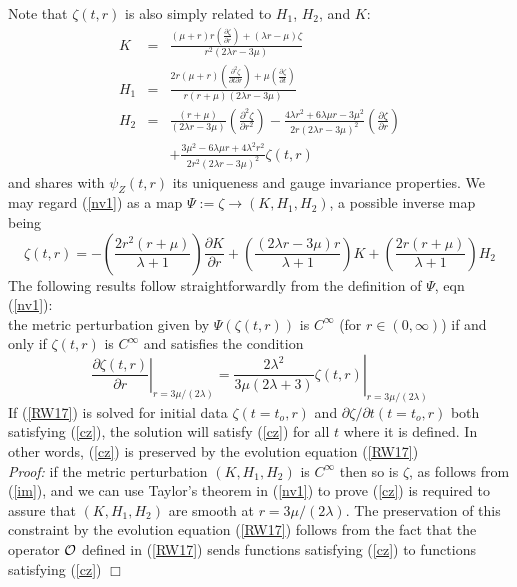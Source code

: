 \documentclass[12pt,aps,floats,showpacs,amssymb,tightenlines]{revtex4}
\newcommand{\p}{\partial}
\begin{document}
Note that $\zeta(t,r)$ is also simply related to $H_1$, $H_2$, and
$K$:
\begin{eqnarray} \nonumber
 K &=& \frac{(\mu+r) r \left( \frac{\p \zeta}{\p r}\right) + (\lambda r - \mu) \zeta}{r^2 (2\lambda r - 3
 \mu)}\\ \label{nv1}
H_1 & = & \frac{2 r (\mu+r) \left( \frac{\p^2 \zeta}{\p t \p r}
\right) + \mu \left( \frac{\p \zeta}{\p t} \right)}{r (r+\mu) (2
\lambda r - 3 \mu)} \\ \nonumber H_2 & = & \frac{(r+\mu)}{(2 \lambda
r - 3 \mu)} \left( \frac{\p^2\zeta}{\p r^2} \right) -  \frac{4
\lambda r^2 + 6 \lambda \mu r - 3 \mu^2}{2 r (2 \lambda r - 3
\mu)^2} \left( \frac{\p \zeta}{\p r} \right) \\ && + \frac{3 \mu^2 -
6\lambda \mu r + 4 \lambda^2r^2}{2 r^2(2 \lambda r - 3 \mu)^2}
\zeta(t,r) \nonumber
\end{eqnarray}
and shares with $\psi_Z(t,r)$ its uniqueness and gauge
 invariance properties.
We may regard (\ref{nv1}) as a map $\Psi:= \zeta \to (K,H_1,H_2)$, a
possible inverse map being
\begin{equation} \label{im}
\zeta(t,r) = -\left(\frac{2 r^2 (r + \mu)}{\lambda+1} \right)
\frac{\p K}{\p r} + \left( \frac{(2 \lambda r-3 \mu) r}{\lambda+1}
\right) K + \left(\frac{2 r (r + \mu)}{\lambda +1} \right) H_2
\end{equation}
The following results follow straightforwardly from the definition
of $\Psi$, eqn (\ref{nv1}):\\

  the metric perturbation given by
$\Psi(\zeta(t,r))$ is $C^{\infty}$ (for $r \in (0,\infty)$) if and
only if $\zeta(t,r)$ is $C^{\infty}$ and satisfies the condition
\begin{equation} \label{cz}
\left. \frac{\p \zeta(t,r)}{\p r}  \right|_{r=3\mu/(2 \lambda)} =
\left. \frac{2 \lambda^2}{3 \mu (2 \lambda+3)} \zeta(t,r)
\right|_{r=3\mu/(2 \lambda)}
\end{equation}
If (\ref{RW17}) is solved for initial data $\zeta(t=t_o,r)$ and $\p
\zeta /\p t (t=t_o,r)$ both satisfying (\ref{cz}), the solution will
satisfy  (\ref{cz}) for all $t$ where it is defined. In other words,
(\ref{cz}) is preserved by the evolution equation (\ref{RW17})
\\
{\em Proof:} if the metric perturbation $(K,H_1,H_2)$ is
$C^{\infty}$ then so is $\zeta$, as follows from (\ref{im}), and  we
can use Taylor's theorem in (\ref{nv1}) to prove (\ref{cz}) is
required to assure that $(K,H_1,H_2)$ are smooth at $r=3 \mu /(2
\lambda)$. The preservation of this constraint by the evolution
equation (\ref{RW17}) follows from the fact that the operator ${\cal
O}$ defined in (\ref{RW17}) sends functions satisfying (\ref{cz}) to
functions satisfying (\ref{cz}) $\Box$\\
\end{document}
